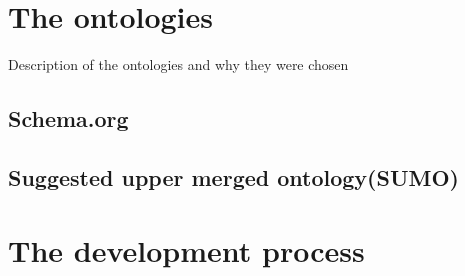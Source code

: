 \section{The ontologies}
Description of the ontologies and why they were chosen

\subsection{Schema.org}

\subsection{Suggested upper merged ontology(SUMO)}

\section{The development process}